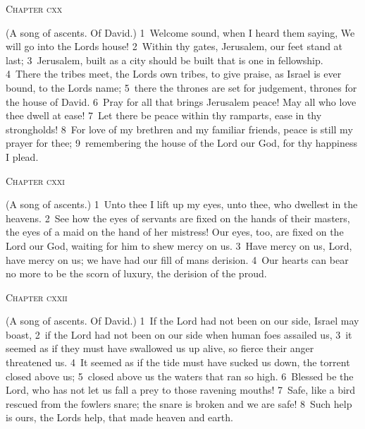 \documentclass[10pt]{book} %
\begin{document}
\begin{large}\begin{center}\textsc{Chapter cxx}\end{center}\end{large}
(A song of ascents. Of David.)
\textcolor{benred8}{1}~Welcome sound, when I heard them saying, We will go into the Lord\textquotesingle s house! \textcolor{benred8}{2}~Within thy gates, Jerusalem, our feet stand at last; \textcolor{benred8}{3}~Jerusalem, built as a city should be built that is one in fellowship. \textcolor{benred8}{4}~There the tribes meet, the Lord\textquotesingle s own tribes, to give praise, as Israel is ever bound, to the Lord\textquotesingle s name; \textcolor{benred8}{5}~there the thrones are set for judgement, thrones for the house of David. \textcolor{benred8}{6}~Pray for all that brings Jerusalem peace! May all who love thee dwell at ease! \textcolor{benred8}{7}~Let there be peace within thy ramparts, ease in thy strongholds! \textcolor{benred8}{8}~For love of my brethren and my familiar friends, peace is still my prayer for thee; \textcolor{benred8}{9}~remembering the house of the Lord our God, for thy happiness I plead.
\begin{large}\begin{center}\textsc{Chapter cxxi}\end{center}\end{large}
(A song of ascents.)
\textcolor{benred8}{1}~Unto thee I lift up my eyes, unto thee, who dwellest in the heavens. \textcolor{benred8}{2}~See how the eyes of servants are fixed on the hands of their masters, the eyes of a maid on the hand of her mistress! Our eyes, too, are fixed on the Lord our God, waiting for him to shew mercy on us. \textcolor{benred8}{3}~Have mercy on us, Lord, have mercy on us; we have had our fill of man\textquotesingle s derision. \textcolor{benred8}{4}~Our hearts can bear no more to be the scorn of luxury, the derision of the proud.
\begin{large}\begin{center}\textsc{Chapter cxxii}\end{center}\end{large}
(A song of ascents. Of David.)
\textcolor{benred8}{1}~If the Lord had not been on our side, Israel may boast, \textcolor{benred8}{2}~if the Lord had not been on our side when human foes assailed us, \textcolor{benred8}{3}~it seemed as if they must have swallowed us up alive, so fierce their anger threatened us. \textcolor{benred8}{4}~It seemed as if the tide must have sucked us down, the torrent closed above us; \textcolor{benred8}{5}~closed above us the waters that ran so high. \textcolor{benred8}{6}~Blessed be the Lord, who has not let us fall a prey to those ravening mouths! \textcolor{benred8}{7}~Safe, like a bird rescued from the fowler\textquotesingle s snare; the snare is broken and we are safe! \textcolor{benred8}{8}~Such help is ours, the Lord\textquotesingle s help, that made heaven and earth.
\end{document}
